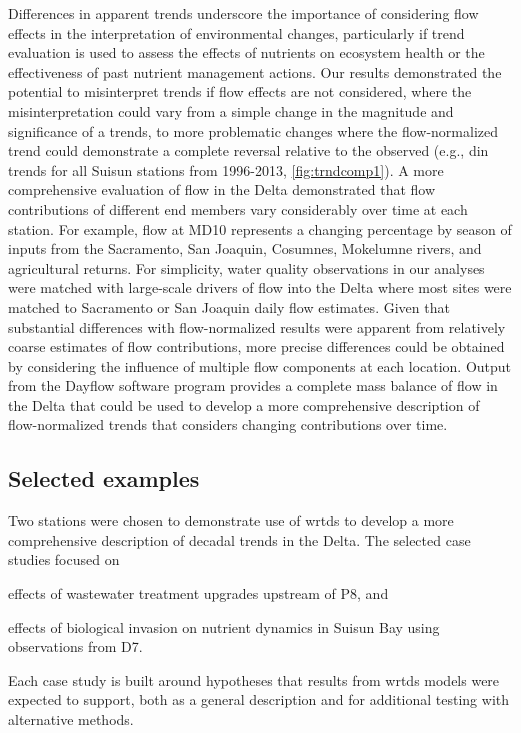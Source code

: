 \documentclass[journal = esthag, manuscript = article]{achemso}\usepackage[]{graphicx}\usepackage[]{color}
\begin{document}
Differences in apparent trends underscore the importance of considering flow effects in the interpretation of environmental changes, particularly if trend evaluation is used to assess the effects of nutrients on ecosystem health or the effectiveness of past nutrient management actions.  Our results demonstrated the potential to misinterpret trends if flow effects are not considered, where the misinterpretation could vary from a simple change in the magnitude and significance of a trends, to more problematic changes where the flow-normalized trend could demonstrate a complete reversal relative to the observed (e.g., \ac{din} trends for all Suisun stations from 1996-2013, \cref{fig:trndcomp1}). A more comprehensive evaluation of flow in the Delta demonstrated that flow contributions of different end members vary considerably over time at each station\cite{Novick15}.  For example, flow at MD10 represents a changing percentage by season of inputs from the Sacramento, San Joaquin, Cosumnes, Mokelumne rivers, and agricultural returns.   For simplicity, water quality observations in our analyses were matched with large-scale drivers of flow into the Delta where most sites were matched to Sacramento or San Joaquin daily flow estimates.  Given that substantial differences with flow-normalized results were apparent from relatively coarse estimates of flow contributions, more precise differences could be obtained by considering the influence of multiple flow components at each location. Output from the Dayflow software program\cite{IEP16} provides a complete mass balance of flow in the Delta that could be used to develop a more comprehensive description of flow-normalized trends that considers changing contributions over time.  

\subsection{Selected examples}

Two stations were chosen to demonstrate use of \ac{wrtds} to develop a more comprehensive description of decadal trends in the Delta.  The selected case studies focused on \begin{inparaenum}[1\upshape)]
\item effects of wastewater treatment upgrades upstream of P8, and
\item effects of biological invasion on nutrient dynamics in Suisun Bay using observations from D7.
\end{inparaenum}
Each case study is built around hypotheses that results from \ac{wrtds} models were expected to support, both as a general description and for additional testing with alternative methods. 
\end{document}
